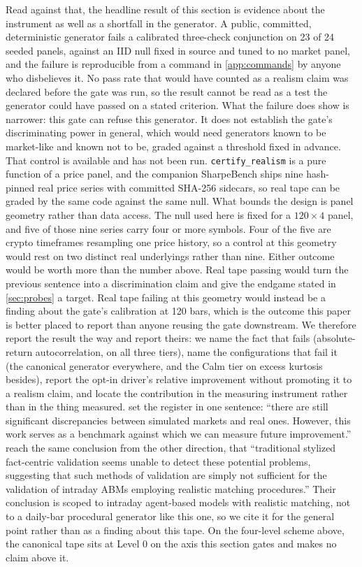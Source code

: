 Read against that, the headline result of this section is evidence about the instrument as well as a shortfall in the generator. A public, committed, deterministic generator fails a calibrated three-check conjunction on 23 of 24 seeded panels, against an IID null fixed in source and tuned to no market panel, and the failure is reproducible from a command in \cref{app:commands} by anyone who disbelieves it. No pass rate that would have counted as a realism claim was declared before the gate was run, so the result cannot be read as a test the generator could have passed on a stated criterion. What the failure does show is narrower: this gate can refuse this generator. It does not establish the gate's discriminating power in general, which would need generators known to be market-like and known not to be, graded against a threshold fixed in advance. That control is available and has not been run. \texttt{certify\_realism} is a pure function of a price panel, and the companion SharpeBench ships nine hash-pinned real price series with committed SHA-256 sidecars, so real tape can be graded by the same code against the same null. What bounds the design is panel geometry rather than data access. The null used here is fixed for a $120\times4$ panel, and five of those nine series carry four or more symbols. Four of the five are crypto timeframes resampling one price history, so a control at this geometry would rest on two distinct real underlyings rather than nine. Either outcome would be worth more than the number above. Real tape passing would turn the previous sentence into a discrimination claim and give the endgame stated in \cref{sec:probes} a target. Real tape failing at this geometry would instead be a finding about the gate's calibration at 120 bars, which is the outcome this paper is better placed to report than anyone reusing the gate downstream. We therefore report the result the way \citet{vyetrenko2020getreal} and \citet{nagy2025lobbench} report theirs: we name the fact that fails (absolute-return autocorrelation, on all three tiers), name the configurations that fail it (the canonical generator everywhere, and the Calm tier on excess kurtosis besides), report the opt-in driver's relative improvement without promoting it to a realism claim, and locate the contribution in the measuring instrument rather than in the thing measured.  set the register in one sentence: ``there are still significant discrepancies between simulated markets and real ones. However, this work serves as a benchmark against which we can measure future improvement.''  reach the same conclusion from the other direction, that ``traditional stylized fact-centric validation seems unable to detect these potential problems, suggesting that such methods of validation are simply not sufficient for the validation of intraday ABMs employing realistic matching procedures.'' Their conclusion is scoped to intraday agent-based models with realistic matching, not to a daily-bar procedural generator like this one, so we cite it for the general point rather than as a finding about this tape. On the four-level scheme above, the canonical tape sits at Level 0 on the axis this section gates and makes no claim above it.

